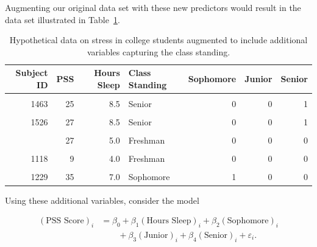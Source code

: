 \documentclass[
  letterpaper,
  DIV=11,
  numbers=noendperiod]{scrreprt}
\theoremstyle{definition}
\theoremstyle{definition}
\theoremstyle{remark}
\begin{document}
Augmenting our original data set with these new predictors would result
in the data set illustrated in
Table~\ref{tbl-modeling-categorical-predictors-stress-data-aug}.

\hypertarget{tbl-modeling-categorical-predictors-stress-data-aug}{}
\begin{table}
\caption{\label{tbl-modeling-categorical-predictors-stress-data-aug}Hypothetical data on stress in college students augmented to include
additional variables capturing the class standing. }\tabularnewline

\centering
\begin{tabular}[t]{rrrlrrr}
\toprule
Subject ID & PSS & Hours Sleep & Class Standing & Sophomore & Junior & Senior\\
\midrule
\cellcolor{gray!10}{1415} & \cellcolor{gray!10}{14} & \cellcolor{gray!10}{7.5} & \cellcolor{gray!10}{Freshman} & \cellcolor{gray!10}{0} & \cellcolor{gray!10}{0} & \cellcolor{gray!10}{0}\\
1463 & 25 & 8.5 & Senior & 0 & 0 & 1\\
\cellcolor{gray!10}{1179} & \cellcolor{gray!10}{26} & \cellcolor{gray!10}{7.0} & \cellcolor{gray!10}{Junior} & \cellcolor{gray!10}{0} & \cellcolor{gray!10}{1} & \cellcolor{gray!10}{0}\\
1526 & 27 & 8.5 & Senior & 0 & 0 & 1\\
\cellcolor{gray!10}{1195} & \cellcolor{gray!10}{5} & \cellcolor{gray!10}{8.0} & \cellcolor{gray!10}{Sophomore} & \cellcolor{gray!10}{1} & \cellcolor{gray!10}{0} & \cellcolor{gray!10}{0}\\
\addlinespace
1938 & 27 & 5.0 & Freshman & 0 & 0 & 0\\
\cellcolor{gray!10}{1818} & \cellcolor{gray!10}{28} & \cellcolor{gray!10}{5.5} & \cellcolor{gray!10}{Junior} & \cellcolor{gray!10}{0} & \cellcolor{gray!10}{1} & \cellcolor{gray!10}{0}\\
1118 & 9 & 4.0 & Freshman & 0 & 0 & 0\\
\cellcolor{gray!10}{1299} & \cellcolor{gray!10}{29} & \cellcolor{gray!10}{9.0} & \cellcolor{gray!10}{Freshman} & \cellcolor{gray!10}{0} & \cellcolor{gray!10}{0} & \cellcolor{gray!10}{0}\\
1229 & 35 & 7.0 & Sophomore & 1 & 0 & 0\\
\bottomrule
\end{tabular}
\end{table}

Using these additional variables, consider the model

\[
\begin{aligned}
  (\text{PSS Score})_i &= \beta_0 + \beta_1 (\text{Hours Sleep})_i + \beta_2 (\text{Sophomore})_i \\
    &\qquad + \beta_3 (\text{Junior})_i + \beta_4 (\text{Senior})_i + \varepsilon_i.
\end{aligned}
\]
\end{document}
